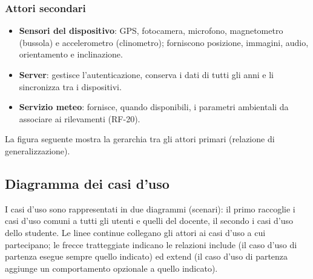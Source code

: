 \subsubsection*{Attori secondari}
\begin{itemize}
    \item \textbf{Sensori del dispositivo}: GPS, fotocamera, microfono, magnetometro (bussola) e accelerometro (clinometro); forniscono posizione, immagini, audio, orientamento e inclinazione.
    \item \textbf{Server}: gestisce l'autenticazione, conserva i dati di tutti gli anni e li sincronizza tra i dispositivi.
    \item \textbf{Servizio meteo}: fornisce, quando disponibili, i parametri ambientali da associare ai rilevamenti (RF-20).
\end{itemize}

La figura seguente mostra la gerarchia tra gli attori primari (relazione di generalizzazione).

\begin{center}
\end{center}

\subsection{Diagramma dei casi d'uso}
I casi d'uso sono rappresentati in due diagrammi (scenari): il primo raccoglie i casi d'uso comuni a tutti gli utenti e quelli del docente, il secondo i casi d'uso dello studente. Le linee continue collegano gli attori ai casi d'uso a cui partecipano; le frecce tratteggiate indicano le relazioni \guillemotleft include\guillemotright{} (il caso d'uso di partenza esegue sempre quello indicato) ed \guillemotleft extend\guillemotright{} (il caso d'uso di partenza aggiunge un comportamento opzionale a quello indicato).

